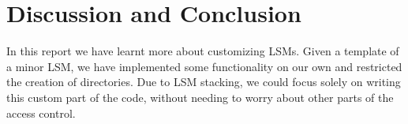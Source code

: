 \documentclass{semdoc}
\begin{document}
\section{Discussion and Conclusion}
In this report we have learnt more about customizing LSMs. Given a template of a minor LSM, we have implemented some functionality on our own and restricted the creation of directories. 
Due to LSM stacking, we could focus solely on writing this custom part of the code, without needing to worry about other parts of the access control.

\printbibliography
\end{document}
